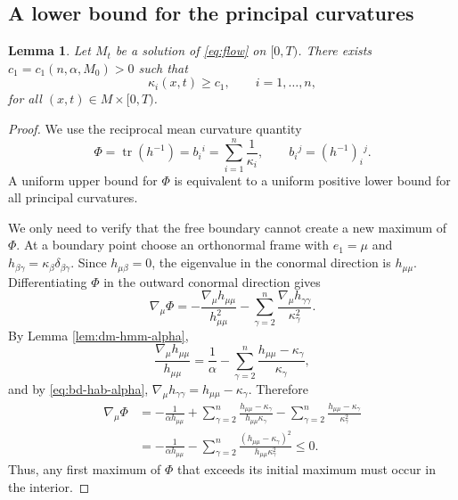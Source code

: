 \documentclass[11pt, reqno]{amsart}
\newtheorem{lemma}[theorem]{Lemma}
\theoremstyle{remark}
\theoremstyle{definition}
\numberwithin{equation}{section}
\DeclareMathOperator{\tr}{tr}
\begin{document}
\subsection{A lower bound for the principal curvatures}
\begin{lemma}\label{lem:kappa-lower-alpha}
Let $M_t$ be a solution of \eqref{eq:flow} on $[0,T)$.  There exists $c_1=c_1(n,\alpha,M_0)>0$ such that
\begin{equation}\label{eq:kappa-lower-alpha}
        \kappa_i(x,t)\ge c_1,
        \qquad i=1,\ldots,n,
\end{equation}
for all $(x,t)\in M\times[0,T)$.
\end{lemma}

\begin{proof}
We use the reciprocal mean curvature quantity
\begin{equation*}
        \Phi=\tr(h^{-1})=b_i{}^i=\sum_{i=1}^n\frac{1}{\kappa_i},
        \qquad b_i{}^j=(h^{-1})_i{}^j.
\end{equation*}
A uniform upper bound for $\Phi$ is equivalent to a uniform positive lower bound for all principal curvatures.

We only need to verify that the free boundary cannot create a new maximum of $\Phi$.  At a boundary point choose an orthonormal frame with $e_1=\mu$ and $h_{\beta\gamma}=\kappa_\beta\delta_{\beta\gamma}$. Since $h_{\mu\beta}=0$, the eigenvalue in the conormal direction is $h_{\mu\mu}$. Differentiating $\Phi$ in the outward conormal direction gives
\begin{equation*}
        \nabla_\mu\Phi
        =-\frac{\nabla_\mu h_{\mu\mu}}{h_{\mu\mu}^2}
          -\sum_{\gamma=2}^n\frac{\nabla_\mu h_{\gamma\gamma}}{\kappa_\gamma^2}.
\end{equation*}
By Lemma \ref{lem:dm-hmm-alpha},
\begin{equation*}
        \frac{\nabla_\mu h_{\mu\mu}}{h_{\mu\mu}}
        =\frac1\alpha-
        \sum_{\gamma=2}^n\frac{h_{\mu\mu}-\kappa_\gamma}{\kappa_\gamma},
\end{equation*}
and by \eqref{eq:bd-hab-alpha}, $\nabla_\mu h_{\gamma\gamma}=h_{\mu\mu}-\kappa_\gamma$.  Therefore
\begin{equation}\label{eq:Dphi}
\begin{aligned}
        \nabla_\mu\Phi
        &=-\frac1{\alpha h_{\mu\mu}}
          +\sum_{\gamma=2}^n\frac{h_{\mu\mu}-\kappa_\gamma}{h_{\mu\mu}\kappa_\gamma}
          -\sum_{\gamma=2}^n\frac{h_{\mu\mu}-\kappa_\gamma}{\kappa_\gamma^2}  \\
        &=-\frac1{\alpha h_{\mu\mu}}
          -\sum_{\gamma=2}^n
          \frac{(h_{\mu\mu}-\kappa_\gamma)^2}{h_{\mu\mu}\kappa_\gamma^2}
        \le0.
\end{aligned}
\end{equation}
Thus, any first maximum of $\Phi$ that exceeds its initial maximum must occur in the interior.  %


\end{proof}
\end{document}
